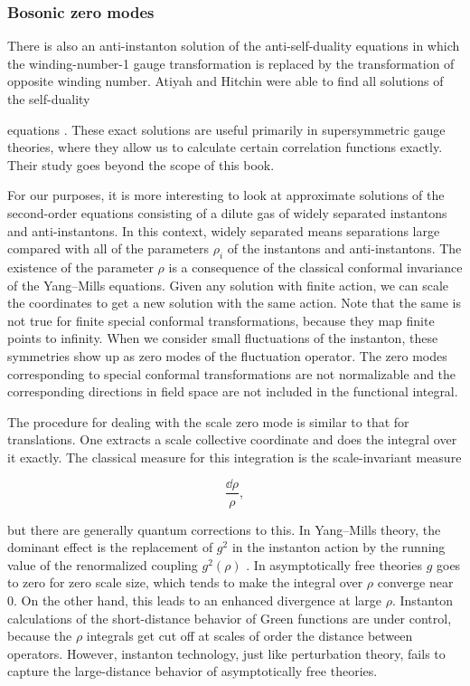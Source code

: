 \subsubsection{Bosonic zero modes}

There is also an anti-instanton solution of the anti-self-duality equations in
which the winding-number-1 gauge transformation is replaced by the
transformation of opposite winding number. Atiyah and Hitchin were able to find
all solutions of the self-duality

equations \cite{banks-ref-141}. These exact solutions are useful primarily in
supersymmetric gauge theories, where they allow us to calculate certain
correlation functions exactly. Their study goes beyond the scope of this book.

For our purposes, it is more interesting to look at approximate solutions of the
second-order equations consisting of a dilute gas of widely separated instantons
and anti-instantons. In this context, widely separated means separations large
compared with all of the parameters $\rho_i$ of the instantons and
anti-instantons. The existence of the parameter $\rho$ is a consequence of the
classical conformal invariance of the Yang--Mills equations. Given any solution
with finite action, we can scale the coordinates to get a new solution with the
same action. Note that the same is not true for finite special conformal
transformations, because they map finite points to infinity. When we consider
small fluctuations of the instanton, these symmetries show up as zero modes of
the fluctuation operator. The zero modes corresponding to special conformal
transformations are not normalizable and the corresponding directions in field
space are not included in the functional integral.

The procedure for dealing with the scale zero mode is similar to that for
translations. One extracts a scale collective coordinate and does the integral
over it exactly. The classical measure for this integration is the scale-invariant
measure

\[
  \frac{\dd\rho}{\rho},
\]

but there are generally quantum corrections to this. In Yang--Mills theory, the
dominant effect is the replacement of $g^2$ in the instanton action by the running
value of the renormalized coupling $g^2(\rho)$ \cite{banks-ref-142}. In
asymptotically free theories $g$ goes to zero for zero scale size, which tends to
make the integral over $\rho$ converge near 0. On the other hand, this leads to
an enhanced divergence at large $\rho$. Instanton calculations of the
short-distance behavior of Green functions are under control, because the $\rho$
integrals get cut off at scales of order the distance between operators. However,
instanton technology, just like perturbation theory, fails to capture the
large-distance behavior of asymptotically free theories.


